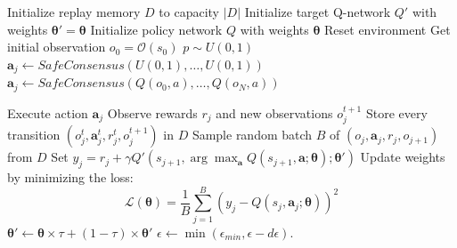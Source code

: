 \documentclass[journal]{IEEEtran}
\newcommand\vect[1]{\boldsymbol{#1}}
\begin{document}
\begin{algorithm}
\caption{Safe Multiagent Double Deep Q-Learning Algorithm}
\label{alg:ddqn}
\begin{algorithmic}[1]
\State Initialize replay memory $D$ to capacity $|D|$
\State Initialize target Q-network $Q'$ with weights $\vect{\theta}' = \vect{\theta}$
\State Initialize policy network $Q$ with weights $\vect{\theta}$
    \State Reset environment
    \State Get initial observation $o_0 = \mathcal{O}(s_0)$
        \State $p \sim U(0,1)$
            \State $\vect{a}_j \leftarrow SafeConsensus(U(0,1), \ldots, U(0,1))$
        \Else
            \State $\vect{a}_j \leftarrow SafeConsensus(Q(o_0,a), \ldots, Q(o_N,a))$
        \EndIf
        
        \State Execute action $\vect{a}_j$
        \State Observe rewards $r_j$ and new observations $o_j^{t+1}$
        \State Store every transition $(o_j^t,\vect{a}_j^t,r_j^t,o_j^{t+1})$ in $D$
        \State Sample random batch $B$ of $(o_j,\vect{a}_j,r_j,o_{j+1})$ from $D$
        \State Set $y_j = r_j + \gamma Q'(s_{j+1}, \arg\max_{\vect{a}} Q(s_{j+1},\vect{a};\vect{\theta});\vect{\theta}')$
        \State Update weights by minimizing the loss:
            \[
            \mathcal{L}(\vect{\theta}) = \frac{1}{B}\sum_{j=1}^{B} (y_j - Q(s_j,\vect{a}_j;\vect{\theta}))^2
            \]
        \State  $\vect{\theta}' \leftarrow \vect{\theta} \times \tau + (1 - \tau) \times \vect{\theta}'$    
    \EndFor
    \State $\epsilon \leftarrow \min(\epsilon_{min}, \epsilon - d\epsilon)$.
\EndFor
\end{algorithmic}
\end{algorithm}
\end{document}
